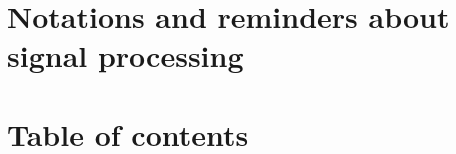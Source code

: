 \documentclass[twoside]{article}
\theoremstyle{remark}
\numberwithin{equation}{subsection}
\newcommand{\TODO}{\textbf{TODO}}
\begin{document}

\newpage
\begin{appendices}
\section{Notations and reminders about signal processing}
	\label{norem}

\section{Table of contents}
\tableofcontents
\end{appendices}
\end{document}
